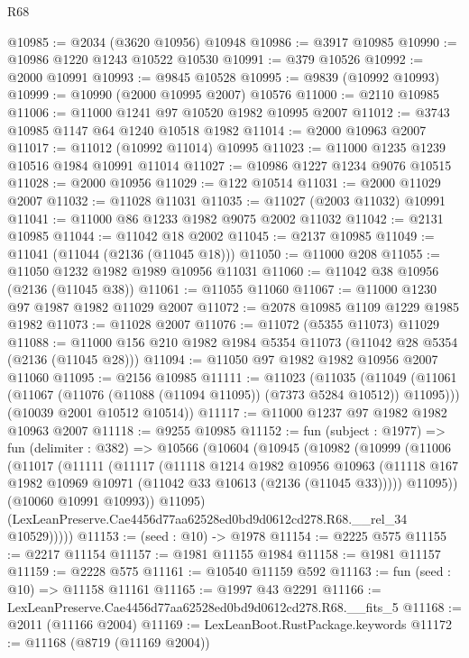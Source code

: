 \begin{lexlean}{R68}
\begin{coremodule}
@10985 := @2034 (@3620 @10956) @10948
@10986 := @3917 @10985
@10990 := @10986 @1220 @1243 @10522 @10530
@10991 := @379 @10526
@10992 := @2000 @10991
@10993 := @9845 @10528
@10995 := @9839 (@10992 @10993)
@10999 := @10990 (@2000 @10995 @2007) @10576
@11000 := @2110 @10985
@11006 := @11000 @1241 @97 @10520 @1982 @10995 @2007
@11012 := @3743 @10985 @1147 @64 @1240 @10518 @1982
@11014 := @2000 @10963 @2007
@11017 := @11012 (@10992 @11014) @10995
@11023 := @11000 @1235 @1239 @10516 @1984 @10991 @11014
@11027 := @10986 @1227 @1234 @9076 @10515
@11028 := @2000 @10956
@11029 := @122 @10514
@11031 := @2000 @11029 @2007
@11032 := @11028 @11031
@11035 := @11027 (@2003 @11032) @10991
@11041 := @11000 @86 @1233 @1982 @9075 @2002 @11032
@11042 := @2131 @10985
@11044 := @11042 @18 @2002
@11045 := @2137 @10985
@11049 := @11041 (@11044 (@2136 (@11045 @18)))
@11050 := @11000 @208
@11055 := @11050 @1232 @1982 @1989 @10956 @11031
@11060 := @11042 @38 @10956 (@2136 (@11045 @38))
@11061 := @11055 @11060
@11067 := @11000 @1230 @97 @1987 @1982 @11029 @2007
@11072 := @2078 @10985 @1109 @1229 @1985 @1982
@11073 := @11028 @2007
@11076 := @11072 (@5355 @11073) @11029
@11088 := @11000 @156 @210 @1982 @1984 @5354 @11073 (@11042 @28 @5354 (@2136 (@11045 @28)))
@11094 := @11050 @97 @1982 @1982 @10956 @2007 @11060
@11095 := @2156 @10985
@11111 := @11023
    (@11035
      (@11049 (@11061 (@11067 (@11076 (@11088 (@11094 @11095)) (@7373 @5284 @10512)) @11095)))
      (@10039 @2001 @10512 @10514))
@11117 := @11000 @1237 @97 @1982 @1982 @10963 @2007
@11118 := @9255 @10985
@11152 := fun (subject : @1977) =>
  fun (delimiter : @382) =>
  @10566
    (@10604
      (@10945
        (@10982
          (@10999
            (@11006
              (@11017
                (@11111
                  (@11117
                    (@11118
                      @1214
                      @1982
                      @10956
                      @10963
                      (@11118 @167 @1982 @10969 @10971 (@11042 @33 @10613 (@2136 (@11045 @33)))))
                    @11095))
                (@10060 @10991 @10993))
              @11095)
            (LexLeanPreserve.Cae4456d77aa62528ed0bd9d0612cd278.R68.__rel_34 @10529)))))
@11153 := (seed : @10) -> @1978
@11154 := @2225 @575
@11155 := @2217 @11154
@11157 := @1981 @11155 @1984
@11158 := @1981 @11157
@11159 := @2228 @575
@11161 := @10540 @11159 @592
@11163 := fun (seed : @10) => @11158 @11161
@11165 := @1997 @43 @2291
@11166 := LexLeanPreserve.Cae4456d77aa62528ed0bd9d0612cd278.R68.__fits_5
@11168 := @2011 (@11166 @2004)
@11169 := LexLeanBoot.RustPackage.keywords
@11172 := @11168 (@8719 (@11169 @2004))

\end{coremodule}
\end{lexlean}
